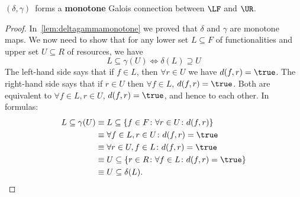 \begin{lemma}
  $(\delta, \gamma)$~forms a \textbf{monotone} Galois connection between $\LF$ and $\UR$.
\end{lemma}
\begin{proof}
  In~\cref{lem:deltagammamonotone} we proved that $\delta$ and $\gamma$ are monotone maps. We now need to show that for any lower set $L\subseteq F$ of functionalities and upper set $U\subseteq R$ of resources, we have
  \begin{equation}
    L\subseteq\gamma(U) \iff \delta(L)\supseteq U
  \end{equation}
  The left-hand side says that if $f\in L$, then $\forall r \in U$ we have $d(f,r)=\true$. The right-hand side says that if $r\in U$ then $\forall f \in L$, $d(f,r)=\true$. Both are equivalent to $\forall f\in L,r\in U$, $d(f,r)=\true$, and hence to each other. In formulas:
  \begin{equation}
    \begin{aligned}
      L \subseteq \gamma(U)&\equiv L\subseteq \{f \in F\colon \forall r\in U\colon d(f,r)\} \\
      &\equiv \forall f\in L, r\in U \colon d(f,r)=\true \\
      &\equiv \forall r\in U, f\in L \colon d(f,r)=\true\\
      &\equiv U\subseteq \{r\in R\colon \forall f\in L\colon d(f,r)=\true \}\\
      &\equiv U\subseteq \delta(L).
    \end{aligned}
  \end{equation}
\end{proof}
